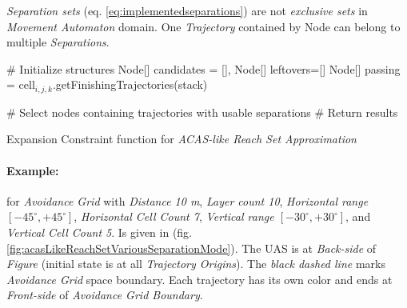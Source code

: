 \begin{note}
    \emph{Separation sets} (eq. \ref{eq:implementedseparations}) are not \emph{exclusive sets} in \emph{Movement Automaton} domain. One \emph{Trajectory} contained by Node can belong to multiple \emph{Separations}.    
\end{note}
\newpage
\begin{algorithm}[H]
    
    \BlankLine
    \# Initialize structures\;
    Node[] candidates = [], Node[] leftovers=[]\;
    Node[] passing = cell$_{i,j,k}$.getFinishingTrajectories(stack)\;
    
    \BlankLine
    \# Select nodes containing trajectories with usable separations\;
    \BlankLine
    \# Return results\;
    
    \caption{Expansion Constraint function for \emph{ACAS-like Reach Set Approximation}}
    \label{alg:ExpansionConstraintFunctionForACASLikeReachSet}    
\end{algorithm}

\paragraph{Example:} for \emph{Avoidance Grid} with \emph{Distance 10 m}, \emph{Layer count 10}, \emph{Horizontal range $[-45^\circ,+45^\circ]$}, \emph{Horizontal Cell Count 7}, \emph{Vertical range $[-30^\circ,+30^\circ]$}, and \emph{Vertical Cell Count 5}. Is given in (fig. \ref{fig:acasLikeReachSetVariousSeparationMode}). The UAS is at \emph{Back-side} of \emph{Figure} (initial state is at all \emph{Trajectory Origins}). The \emph{black dashed line} marks \emph{Avoidance Grid} space boundary. Each trajectory has its own color and ends at \emph{Front-side} of \emph{Avoidance Grid Boundary}.

